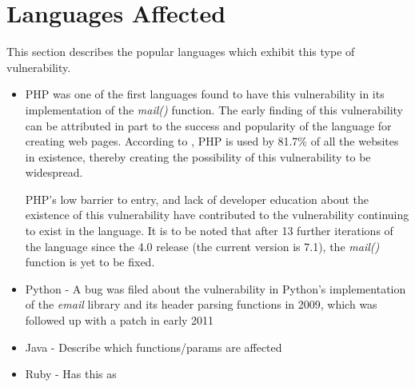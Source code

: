 \section{Languages Affected}

This section describes the popular languages which exhibit this type of vulnerability. 
\begin{itemize}
	\item PHP was one of the first languages found to have this vulnerability in its implementation of the \emph{mail()} function. The early finding of this vulnerability can be attributed in part to the success and popularity of the language for creating web pages. According to \cite{W3techs}, PHP is used by 81.7\% of all the websites in existence, thereby creating the possibility of this vulnerability to be widespread. 
	
	PHP's low barrier to entry, and lack of developer education about the existence of this vulnerability have contributed to the vulnerability continuing to exist in the language.
	It is to be noted that after 13 further iterations of the language since the 4.0 release (the current version is 7.1), the \emph{mail()} function is yet to be fixed.
	
	\item Python - A bug was filed about the vulnerability in Python's implementation of the \emph{email} library and its header parsing functions in 2009, which was followed up with a patch in early 2011
	\item Java - Describe which functions/params are affected
	\item Ruby - Has this as %

\end{itemize}
 
